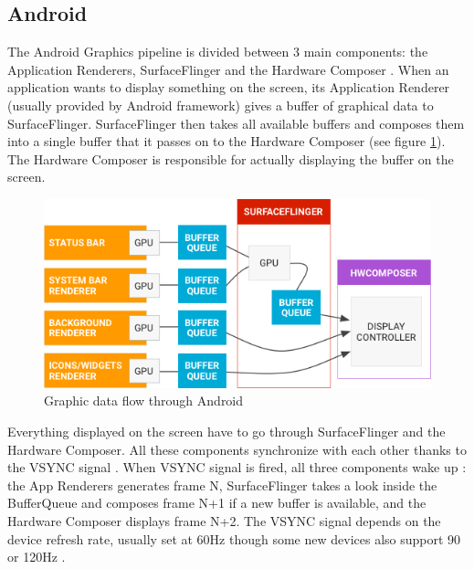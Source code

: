 \documentclass{kththesis}
\begin{document}
\subsection{Android}

The Android Graphics pipeline is divided between 3 main components: the Application Renderers, SurfaceFlinger and the Hardware Composer \cite{android_graphics}.
When an application wants to display something on the screen, its Application Renderer (usually provided by Android framework) gives a buffer of graphical data to SurfaceFlinger. SurfaceFlinger then takes all available buffers and composes them into a single buffer that it passes on to the Hardware Composer (see figure \ref{fig:android_data}). The Hardware Composer is responsible for actually displaying the buffer on the screen.
\newline

\begin{figure}[!ht]
    \includegraphics[width=13cm]{kththesis/Figures/android_data_flow.png}
    \caption[Graphic data flow through Android]{Graphic data flow through Android \footnotemark}
    \label{fig:android_data}
\end{figure}


Everything displayed on the screen have to go through SurfaceFlinger and the Hardware Composer.
All these components synchronize with each other thanks to the VSYNC signal \cite{vsync}. When VSYNC signal is fired, all three components wake up : the App Renderers generates frame N, SurfaceFlinger takes a look inside the BufferQueue and composes frame N+1 if a new buffer is available, and the Hardware Composer displays frame N+2. The VSYNC signal depends on the device refresh rate, usually set at 60Hz though some new devices also support 90 or 120Hz \cite{refresh_rate}.
\end{document}
